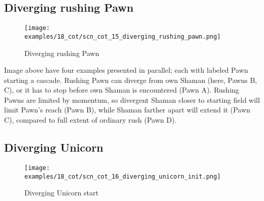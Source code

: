 \clearpage %

\subsection*{Diverging rushing Pawn}
\label{sec:Conquest of Tlalocan/Divergence/Diverging rushing Pawn}

\vspace*{-1.4\baselineskip}
\noindent
\begin{figure}[!h]
\texttt{[image: examples/18\_cot/scn\_cot\_15\_diverging\_rushing\_pawn.png]}
\vspace*{-1.3\baselineskip}
\caption{Diverging rushing Pawn}
\label{fig:scn_cot_15_diverging_rushing_pawn}
\end{figure}

\vspace*{-0.5\baselineskip}
Image above have four examples presented in parallel; each with labeled Pawn starting
a cascade. \newline
\indent
Rushing Pawn can diverge from own Shaman (here, Pawns B, C), or it has to stop before
own Shaman is encountered (Pawn A). Rushing Pawns are limited by momentum, so
divergent Shaman closer to starting field will limit Pawn's reach (Pawn B), while
Shaman farther apart will extend it (Pawn C), compared to full extent of ordinary
rush (Pawn D).

\clearpage %

\subsection*{Diverging Unicorn}
\label{sec:Conquest of Tlalocan/Divergence/Diverging Unicorn}

\vspace*{-1.4\baselineskip}
\noindent
\begin{figure}[!h]
\texttt{[image: examples/18\_cot/scn\_cot\_16\_diverging\_unicorn\_init.png]}
\vspace*{-1.3\baselineskip}
\caption{Diverging Unicorn start}
\label{fig:scn_cot_16_diverging_unicorn_init}
\end{figure}

